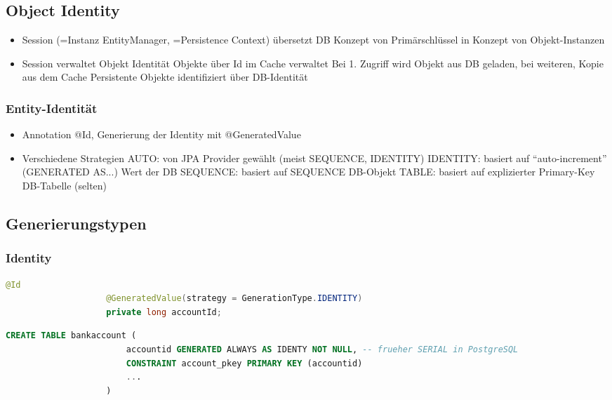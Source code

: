 \documentclass[a4paper, landscape, 8pt]{scrartcl}
\begin{document}
\begin{multicols*}{4}
        \subsection{Object Identity}
        \begin{itemize}
            \item Session (=Instanz EntityManager, =Persistence Context) übersetzt DB Konzept von Primärschlüssel in Konzept von Objekt-Instanzen
            \item Session verwaltet Objekt Identität
            \subitem Objekte über Id im Cache verwaltet
            \subitem Bei 1. Zugriff wird Objekt aus DB geladen, bei weiteren, Kopie aus dem Cache
            \subitem Persistente Objekte identifiziert über DB-Identität
        \end{itemize}

        \subsubsection{Entity-Identität}
        \begin{itemize}
            \item Annotation @Id, Generierung der Identity mit @GeneratedValue
            \item Verschiedene Strategien
            \subitem AUTO: von JPA Provider gewählt (meist SEQUENCE, IDENTITY)
            \subitem IDENTITY: basiert auf \enquote{auto-increment} (GENERATED AS...) Wert der DB
            \subitem SEQUENCE: basiert auf SEQUENCE DB-Objekt
            \subitem TABLE: basiert auf explizierter Primary-Key DB-Tabelle (selten)
        \end{itemize}

        \subsection{Generierungstypen}
        \subsubsection{Identity}
        \begin{lstlisting}[language=java]
                    @Id
                    @GeneratedValue(strategy = GenerationType.IDENTITY)
                    private long accountId;
        \end{lstlisting}
        \begin{lstlisting}[language=sql]
                    CREATE TABLE bankaccount (
                        accountid GENERATED ALWAYS AS IDENTY NOT NULL, -- frueher SERIAL in PostgreSQL
                        CONSTRAINT account_pkey PRIMARY KEY (accountid)
                        ...
                    )
        \end{lstlisting}


\end{multicols*}
\end{document}
